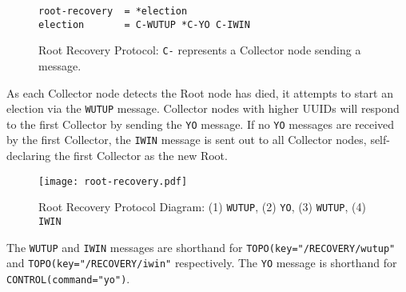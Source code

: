 \begin{figure}[H]
\vspace{+10pt}
\begin{verbatim}
root-recovery  = *election
election       = C-WUTUP *C-YO C-IWIN
\end{verbatim}
\vspace{-5pt}
\caption[Root Recovery Protocol]
        {Root Recovery Protocol: \texttt{C-} represents a Collector node sending a message.}
\label{fig:proto_reco_root_spec}
\end{figure}

As each Collector node detects the Root node has died, it attempts to start an election via the \texttt{WUTUP} message.
Collector nodes with higher UUIDs will respond to the first Collector by sending the \texttt{YO} message. If no
\texttt{YO} messages are received by the first Collector, the \texttt{IWIN} message is sent out to all Collector nodes,
self-declaring the first Collector as the new Root.

\begin{figure}[H]
    \centering
    \texttt{[image: root-recovery.pdf]}
    \label{fig:proto_root_reco_image}
    \caption[Root Recovery Protocol Diagram]
	    {Root Recovery Protocol Diagram: (1) \texttt{WUTUP}, (2) \texttt{YO}, (3) \texttt{WUTUP}, (4) \texttt{IWIN}}
\end{figure}

The \texttt{WUTUP} and \texttt{IWIN} messages are shorthand for \texttt{TOPO(key="/RECOVERY/wutup"} and
\texttt{TOPO(key="/RECOVERY/iwin"} respectively. The \texttt{YO} message is shorthand for
\texttt{CONTROL(command="yo")}.
